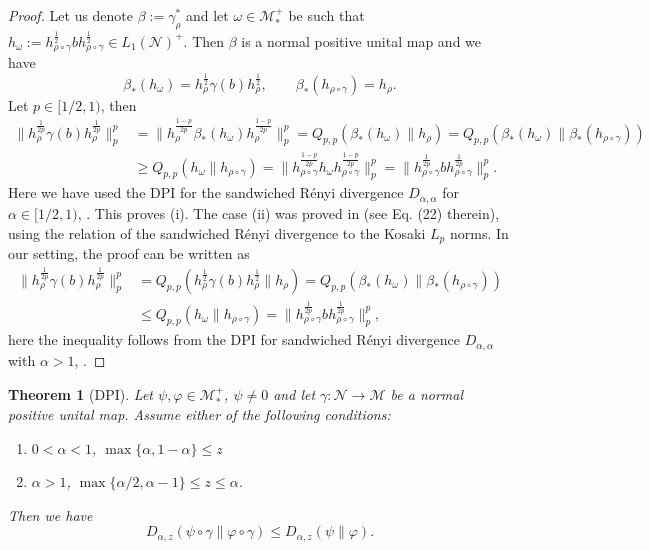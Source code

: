\documentclass[12pt]{article}
\newtheorem{theorem}{Theorem}[section]
\theoremstyle{definition}
\theoremstyle{remark}
\def\Me{\mathcal M}
\def\Ne{\mathcal N}
\begin{document}
\begin{proof} Let us denote $\beta:=\gamma_\rho^*$ and let $\omega\in \Me_*^+$ be such
that 
$h_\omega:=h_{\rho\circ\gamma}^{\frac{1}{2}}bh_{\rho\circ\gamma}^{\frac{1}{2}}\in L_1(\Ne)^+$. Then
$\beta$ is a normal positive unital map and  we have 
\[
\beta_*(h_\omega)=h_\rho^{\frac{1}{2}}\gamma(b)h_\rho^{\frac{1}{2}},\qquad
\beta_*(h_{\rho\circ\gamma})=h_\rho.
\]
Let $p\in [1/2,1)$, then  
\begin{align*}
\|h_{\rho}^{\frac{1}{2p}}\gamma(b)h_{\rho}^{\frac{1}{2p}}\|^p_p&=
\|h_\rho^{\frac{1-p}{2p}}\beta_*(h_\omega)h_\rho^{\frac{1-p}{2p}}\|_p^p=
Q_{p,p}(\beta_*(h_\omega)\|h_\rho)=Q_{p,p}(\beta_*(h_\omega)\|\beta_*(h_{\rho\circ\gamma}))\\
&\ge  Q_{p,p}(h_\omega\|h_{\rho\circ\gamma})=\|h_{\rho\circ\gamma}^{\frac{1-p}{2p}}h_\omega
h_{\rho\circ\gamma}^{\frac{1-p}{2p}}\|_p^p=\|h_{\rho\circ\gamma}^{\frac{1}{2p}}bh_{\rho\circ\gamma}^{\frac{1}{2p}}\|^p_p.
\end{align*}
Here we have used the DPI for the sandwiched R\'enyi  divergence $D_{\alpha,\alpha}$ for
$\alpha\in [1/2,1)$, \cite[Theorem 4.1]{jencova2021renyi}.  This proves (i). 
The case (ii) was proved in \cite{kato2023onrenyi} (see Eq. (22) therein), using the
relation of the sandwiched R\'enyi divergence to the Kosaki $L_p$ norms. In our setting,
the proof can be written as 
\begin{align*}
\|h_\rho^{\frac{1}{2p}}\gamma(b)h_\rho^{\frac{1}{2p}}\|_p^p&=Q_{p,p}(h_\rho^{\frac{1}{2}}\gamma(b)h_\rho^{\frac{1}{2}}\|h_\rho)=Q_{p,p}(\beta_*(h_\omega)\|\beta_*(h_{\rho\circ\gamma}))\\
&\le
Q_{p,p}(h_\omega\|h_{\rho\circ\gamma})=\|h_{\rho\circ\gamma}^{\frac{1}{2p}}bh_{\rho\circ\gamma}^{\frac{1}{2p}}\|^p_p,
\end{align*}
here the inequality follows from the DPI for sandwiched R\'enyi divergence
$D_{\alpha,\alpha}$ with
$\alpha>1$, \cite[]{jencova2018renyi}.


\end{proof}




\begin{theorem}[DPI] \label{thm:dpi} Let $\psi,\varphi\in \Me_*^+$, $\psi\ne 0$ and let $\gamma:
\Ne\to \Me$ be a normal positive unital map. Assume either of the following conditions:
\begin{enumerate}
\item[(i)] $0<\alpha<1$, $\max\{\alpha,1-\alpha\}\le z$
\item[(ii)] $\alpha>1$, $\max\{\alpha/2,\alpha-1\}\le z\le \alpha$.
\end{enumerate}
Then we have
\[
D_{\alpha,z}(\psi\circ\gamma\|\varphi\circ\gamma)\le D_{\alpha,z}(\psi\|\varphi).
\]


\end{theorem}
\end{document}
